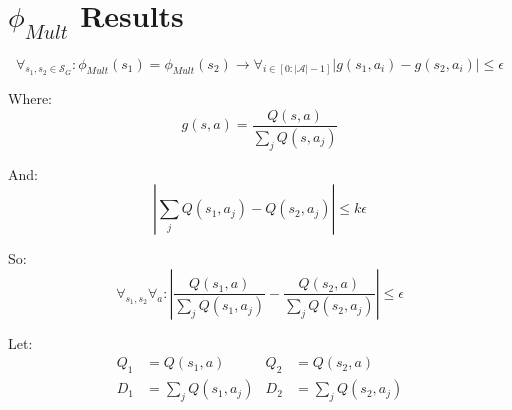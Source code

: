 \documentclass[11pt]{amsart}
\begin{document}
%
%
%

\newpage
\section{$\phi_{Mult}$ Results}

\begin{equation}
\forall_{s_1, s_2 \in \mathcal{S}_G} : \phi_{Mult}(s_1) = \phi_{Mult}(s_2) \rightarrow \forall_{i \in [0:|\mathcal{A}| - 1]} | g(s_1, a_i) - g(s_2, a_i) | \leq \epsilon
\label{eq:phi_d}
\end{equation}

Where:
\begin{equation}
g(s,a) = \frac{Q(s,a)}{\sum_j Q(s,a_j)}
\end{equation}

And:
\begin{equation}
|\sum_j Q(s_1,a_j) - Q(s_2,a_j) | \leq k\epsilon
\end{equation}

So:
\begin{equation}
\forall_{s_1,s_2} \forall_a : | \frac{Q(s_1,a)}{\sum_j Q(s_1,a_j)} - \frac{Q(s_2,a)}{\sum_j Q(s_2,a_j)} | \leq \epsilon
\end{equation}

Let:
\begin{align}
Q_1 &= Q(s_1,a) &Q_2 &= Q(s_2,a) \\
D_1 &= \sum_j Q(s_1,a_j) &D_2 &= \sum_j Q(s_2,a_j) 
\end{align}
\end{document}
